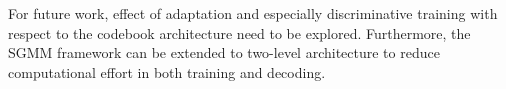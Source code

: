 \documentclass{article}
\begin{document}
For future work, effect of adaptation and especially discriminative training
with respect to the codebook architecture need to be explored.
Furthermore, the SGMM framework can be extended to two-level architecture to 
reduce computational effort in both training and decoding.




\end{document}
